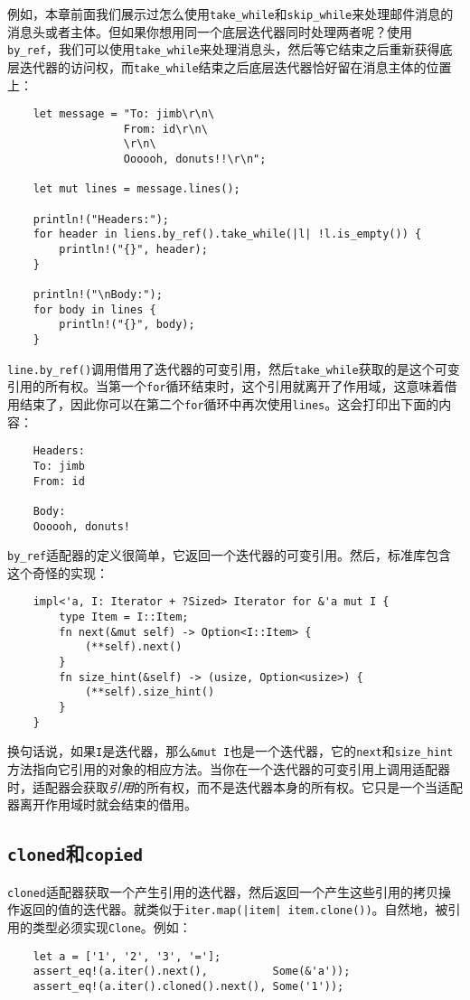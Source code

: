 例如，本章前面我们展示过怎么使用\texttt{take\_while}和\texttt{skip\_while}来处理邮件消息的消息头或者主体。但如果你想用同一个底层迭代器同时处理两者呢？使用\texttt{by\_ref}，我们可以使用\texttt{take\_while}来处理消息头，然后等它结束之后重新获得底层迭代器的访问权，而\texttt{take\_while}结束之后底层迭代器恰好留在消息主体的位置上：
\begin{verbatim}
    let message = "To: jimb\r\n\
                  From: id\r\n\
                  \r\n\
                  Oooooh, donuts!!\r\n";

    let mut lines = message.lines();

    println!("Headers:");
    for header in liens.by_ref().take_while(|l| !l.is_empty()) {
        println!("{}", header);
    }

    println!("\nBody:");
    for body in lines {
        println!("{}", body);
    }
\end{verbatim}
\texttt{line.by\_ref()}调用借用了迭代器的可变引用，然后\texttt{take\_while}获取的是这个可变引用的所有权。当第一个\texttt{for}循环结束时，这个引用就离开了作用域，这意味着借用结束了，因此你可以在第二个\texttt{for}循环中再次使用\texttt{lines}。这会打印出下面的内容：
\begin{verbatim}
    Headers:
    To: jimb
    From: id

    Body:
    Oooooh, donuts!
\end{verbatim}

\texttt{by\_ref}适配器的定义很简单，它返回一个迭代器的可变引用。然后，标准库包含这个奇怪的实现：
\begin{verbatim}
    impl<'a, I: Iterator + ?Sized> Iterator for &'a mut I {
        type Item = I::Item;
        fn next(&mut self) -> Option<I::Item> {
            (**self).next()
        }
        fn size_hint(&self) -> (usize, Option<usize>) {
            (**self).size_hint()
        }
    }
\end{verbatim}

换句话说，如果\texttt{I}是迭代器，那么\texttt{\&mut I}也是一个迭代器，它的\texttt{next}和\texttt{size\_hint}方法指向它引用的对象的相应方法。当你在一个迭代器的可变引用上调用适配器时，适配器会获取\emph{引用}的所有权，而不是迭代器本身的所有权。它只是一个当适配器离开作用域时就会结束的借用。

\subsection{\texttt{cloned}和\texttt{copied}}
\texttt{cloned}适配器获取一个产生引用的迭代器，然后返回一个产生这些引用的拷贝操作返回的值的迭代器。就类似于\texttt{iter.map(|item| item.clone())}。自然地，被引用的类型必须实现\texttt{Clone}。例如：
\begin{verbatim}
    let a = ['1', '2', '3', '='];
    assert_eq!(a.iter().next(),          Some(&'a'));
    assert_eq!(a.iter().cloned().next(), Some('1'));
\end{verbatim}

